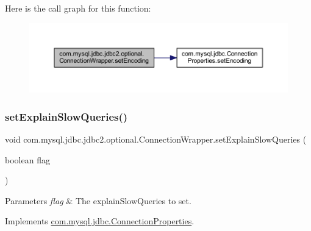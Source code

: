 Here is the call graph for this function\+:
\nopagebreak
\begin{figure}[H]
\begin{center}
\leavevmode
\includegraphics[width=350pt]{classcom_1_1mysql_1_1jdbc_1_1jdbc2_1_1optional_1_1_connection_wrapper_ab8560df5f3d4e0152cd9181509c1e1ae_cgraph}
\end{center}
\end{figure}
\mbox{\label{classcom_1_1mysql_1_1jdbc_1_1jdbc2_1_1optional_1_1_connection_wrapper_a87b59ff60acc2b82007b597ca7c56799}} 
\subsubsection{\texorpdfstring{set\+Explain\+Slow\+Queries()}{setExplainSlowQueries()}}
{\footnotesize\ttfamily void com.\+mysql.\+jdbc.\+jdbc2.\+optional.\+Connection\+Wrapper.\+set\+Explain\+Slow\+Queries (\begin{DoxyParamCaption}\item[{boolean}]{flag }\end{DoxyParamCaption})}


\begin{DoxyParams}{Parameters}
{\em flag} & The explain\+Slow\+Queries to set. \\
\hline
\end{DoxyParams}


Implements \mbox{\hyperlink{interfacecom_1_1mysql_1_1jdbc_1_1_connection_properties_a9857fb61eea34e28c3bbff76b6ac5ca9}{com.\+mysql.\+jdbc.\+Connection\+Properties}}.

